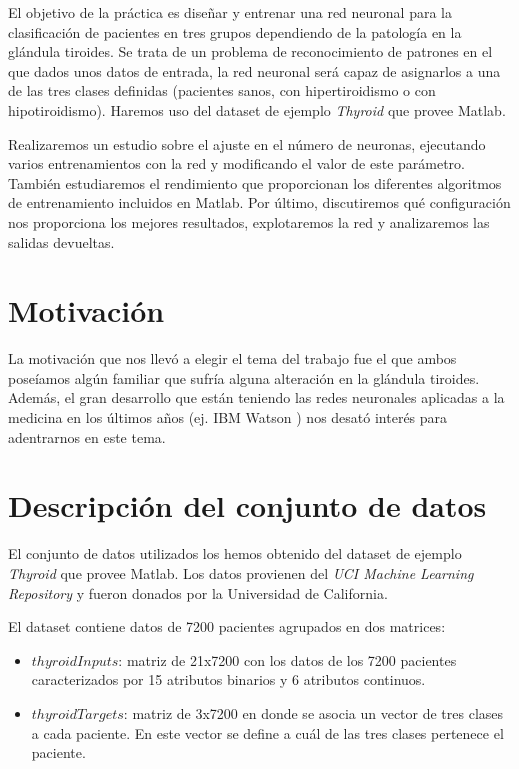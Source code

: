 \documentclass[a4paper,12pt,titlepage]{article}
\begin{document}
El objetivo de la práctica es diseñar y entrenar una red neuronal para la clasificación de pacientes en tres grupos dependiendo de la patología en la glándula tiroides. Se trata de un problema de reconocimiento de patrones en el que dados unos datos de entrada, la red neuronal será capaz de asignarlos a una de las tres clases definidas (pacientes sanos, con hipertiroidismo o con hipotiroidismo). Haremos uso del dataset de ejemplo \emph{Thyroid} que provee Matlab.

Realizaremos un estudio sobre el ajuste en el número de neuronas, ejecutando varios entrenamientos con la red y modificando el valor de este parámetro. También estudiaremos el rendimiento que proporcionan los diferentes algoritmos de entrenamiento  incluidos en Matlab. Por último, discutiremos qué configuración nos proporciona los mejores resultados, explotaremos la red y analizaremos las salidas devueltas.

\section{Motivación}

La motivación que nos llevó a elegir el tema del trabajo fue el que ambos poseíamos algún familiar que sufría alguna alteración en la glándula tiroides. Además, el gran desarrollo que están teniendo las redes neuronales aplicadas a la medicina en los últimos años (ej. IBM Watson \citep{wiki:watson}) nos desató interés para adentrarnos en este tema.

\section{Descripción del conjunto de datos}

El conjunto de datos utilizados los hemos obtenido del dataset de ejemplo \emph{Thyroid} que provee Matlab. Los datos provienen del \emph{UCI Machine Learning Repository} \citep{Asuncion+Newman:2007} y fueron donados por la Universidad de California.

El dataset contiene datos de 7200 pacientes agrupados en dos matrices:

\begin{itemize}[noitemsep]
	\item $thyroidInputs$: matriz de 21x7200 con los datos de los 7200 pacientes caracterizados por 15 atributos binarios y 6 atributos continuos.
	\item $thyroidTargets$: matriz de 3x7200 en donde se asocia un vector de tres clases a cada paciente. En este vector se define a cuál de las tres clases pertenece el paciente.
\end{itemize}
\end{document}
